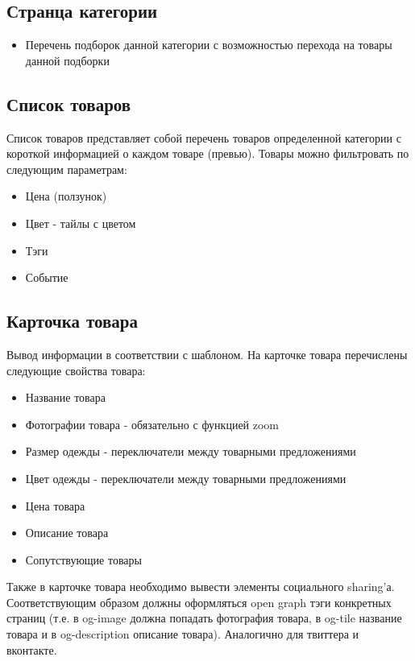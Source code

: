 \documentclass[DIV=calc, paper=a4, fontsize=11pt]{scrartcl} %
\begin{document}
\subsection{Странца категории}
\begin{itemize}
	\item Перечень подборок данной категории с возможностью перехода на товары данной подборки
\end{itemize}


\subsection{Список товаров}
Список товаров представляет собой перечень товаров определенной категории с короткой информацией о каждом товаре (превью). Товары можно фильтровать по следующим параметрам:

\begin{itemize}
	\item Цена (ползунок)
	\item Цвет - тайлы с цветом
	\item Тэги
	\item Событие
\end{itemize}

\subsection{Карточка товара}
Вывод информации в соответствии с шаблоном. На карточке товара перечислены следующие свойства товара:

\begin{itemize}
	\item Название товара
	\item Фотографии товара - обязательно с функцией zoom
	\item Размер одежды - переключатели между товарными предложениями
	\item Цвет одежды - переключатели между товарными предложениями
	\item Цена товара
	\item Описание товара
	\item Сопутствующие товары
\end{itemize}

Также в карточке товара необходимо вывести элементы социального sharing'а. Соответствующим образом должны оформляться open graph тэги конкретных страниц (т.е. в og-image должна попадать фотография товара, в og-tile название товара и в og-description описание товара). Аналогично для твиттера и вконтакте.
\end{document}
